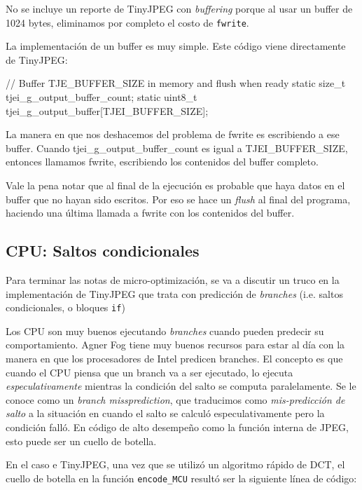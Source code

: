 {No se incluye un reporte de TinyJPEG con \emph{buffering} porque al usar un
buffer de 1024 bytes, eliminamos por completo el costo de \verb+fwrite+.

La implementación de un buffer es muy simple. Este código viene directamente de TinyJPEG:

\begin{code}[language=C][h]
    // Buffer TJE_BUFFER_SIZE in memory and flush when ready
    static size_t tjei_g_output_buffer_count;
    static uint8_t tjei_g_output_buffer[TJEI_BUFFER_SIZE];
\end{code}

La manera en que nos deshacemos del problema de fwrite es escribiendo a ese
buffer.  Cuando tjei\_g\_output\_buffer\_count es igual a TJEI\_BUFFER\_SIZE,
entonces llamamos fwrite, escribiendo los contenidos del buffer completo.

Vale la pena notar que al final de la ejecución es probable que haya datos en
el buffer que no hayan sido escritos. Por eso se hace un \emph{flush} al final
del programa, haciendo una última llamada a fwrite con los contenidos del
buffer.

\subsection{CPU: Saltos condicionales}\label{sub:cpu-branch}

Para terminar las notas de micro-optimización, se va a discutir un truco en la
implementación de TinyJPEG que trata con predicción de \emph{branches} (i.e.
saltos condicionales, o bloques \verb+if+)

Los CPU son muy buenos ejecutando \emph{branches} cuando pueden predecir su
comportamiento. Agner Fog \cite{agner} tiene muy buenos recursos para estar al
día con la manera en que los procesadores de Intel predicen branches. El
concepto es que cuando el CPU piensa que un branch va a ser ejecutado, lo
ejecuta \emph{ especulativamente } mientras la condición del salto se computa
paralelamente. Se le conoce como un \emph{branch missprediction}, que
traducimos como \emph{mis-predicción de salto} a la situación en cuando el
salto se calculó especulativamente pero la condición falló. En código de alto
desempeño como la función interna de JPEG, esto puede ser un cuello de botella.

En el caso e TinyJPEG, una vez que se utilizó un algoritmo rápido de DCT, el
cuello de botella en la función \verb+encode_MCU+ resultó ser la siguiente
línea de código:

}
